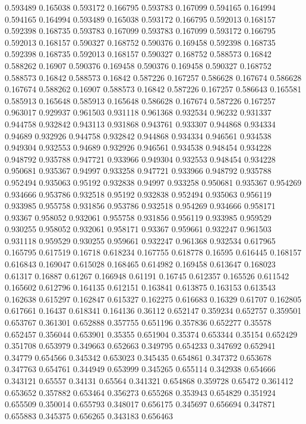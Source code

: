 0.593489 0.165038
0.593172 0.166795
0.593783 0.167099
0.594165 0.164994
0.594165 0.164994
0.593489 0.165038
0.593172 0.166795
0.592013 0.168157
0.592398 0.168735
0.593783 0.167099
0.593783 0.167099
0.593172 0.166795
0.592013 0.168157
0.590327 0.168752
0.590376 0.169458
0.592398 0.168735
0.592398 0.168735
0.592013 0.168157
0.590327 0.168752
0.588573 0.16842
0.588262 0.16907
0.590376 0.169458
0.590376 0.169458
0.590327 0.168752
0.588573 0.16842
0.588573 0.16842
0.587226 0.167257
0.586628 0.167674
0.586628 0.167674
0.588262 0.16907
0.588573 0.16842
0.587226 0.167257
0.586643 0.165581
0.585913 0.165648
0.585913 0.165648
0.586628 0.167674
0.587226 0.167257
0.963017 0.929937
0.961503 0.931118
0.961368 0.932534
0.96232 0.931337
0.944758 0.932842
0.943113 0.931868
0.943761 0.933307
0.944868 0.934334
0.94689 0.932926
0.944758 0.932842
0.944868 0.934334
0.946561 0.934538
0.949304 0.932553
0.94689 0.932926
0.946561 0.934538
0.948454 0.934228
0.948792 0.935788
0.947721 0.933966
0.949304 0.932553
0.948454 0.934228
0.950681 0.935367
0.94997 0.933258
0.947721 0.933966
0.948792 0.935788
0.952494 0.935063
0.95192 0.932838
0.94997 0.933258
0.950681 0.935367
0.954269 0.934666
0.953786 0.932518
0.95192 0.932838
0.952494 0.935063
0.956119 0.933985
0.955758 0.931856
0.953786 0.932518
0.954269 0.934666
0.958171 0.93367
0.958052 0.932061
0.955758 0.931856
0.956119 0.933985
0.959529 0.930255
0.958052 0.932061
0.958171 0.93367
0.959661 0.932247
0.961503 0.931118
0.959529 0.930255
0.959661 0.932247
0.961368 0.932534
0.617965 0.165795
0.617519 0.16718
0.618234 0.167755
0.618778 0.16595
0.616445 0.168157
0.616843 0.169047
0.615028 0.168465
0.614982 0.169458
0.613647 0.168023
0.61317 0.16887
0.61267 0.166948
0.61191 0.16745
0.612357 0.165526
0.611542 0.165602
0.612796 0.164135
0.612151 0.163841
0.613875 0.163153
0.613543 0.162638
0.615297 0.162847
0.615327 0.162275
0.616683 0.16329
0.61707 0.162805
0.617661 0.16437
0.618341 0.164136
0.36112 0.652147
0.359234 0.652757
0.359501 0.653767
0.361301 0.652888
0.357755 0.651196
0.357836 0.652277
0.35578 0.652457
0.356044 0.653901
0.35355 0.651904
0.35374 0.653344
0.35154 0.652429
0.351708 0.653979
0.349663 0.652663
0.349795 0.654233
0.347692 0.652941
0.34779 0.654566
0.345342 0.653023
0.345435 0.654861
0.347372 0.653678
0.347763 0.654761
0.344949 0.653999
0.345265 0.655114
0.342938 0.654666
0.343121 0.65557
0.34131 0.65564
0.341321 0.654868
0.359728 0.65472
0.361412 0.653652
0.357882 0.653464
0.356273 0.655268
0.353943 0.654829
0.351924 0.655509
0.350014 0.655793
0.348017 0.656175
0.345697 0.656694
0.347871 0.655883
0.345375 0.656265
0.343183 0.656463

